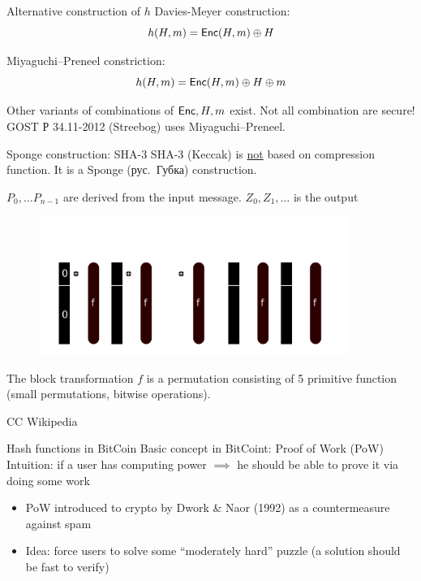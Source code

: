 \documentclass[usenames,dvipsnames, 9pt]{beamer}
\begin{document}
\begin{frame}{Alternative construction of $h$}
	\Large
	{\color{Orange} Davies-Meyer construction:}
	\[
	h(H, m) = \textsf{Enc}(H, m)\oplus H
	\]
	
	 {\color{Orange} Miyaguchi–Preneel  constriction:}
	 \[
	 h(H, m) = \textsf{Enc}(H, m)\oplus H \oplus m
	 \]
	 
	 Other variants of combinations of $\textsf{Enc}, H, m$ exist. Not all combination are secure! \\
	 GOST  Р 34.11-2012 (Streebog) uses Miyaguchi–Preneel.

\end{frame}

\begin{frame}{Sponge construction: SHA-3}
\large
SHA-3 (Keccak) is \underline{not} based on compression function. It is a {\color{Orange} Sponge} (рус.\ Губка) construction.

$P_0, \ldots P_{n-1}$ are derived from the input message.
$Z_0, Z_1, \ldots$ is the output

\begin{figure}
	\includegraphics[width=0.9\textwidth]{SpongeConstruction}
\end{figure}

The block transformation $f$ is  a permutation consisting of 5 primitive function (small permutations, bitwise operations).


\vfill
\small
{\color{gray} CC Wikipedia} 

\end{frame}


\begin{frame}{Hash functions in BitCoin}
\Large
Basic concept in BitCoint: {\color{Orange} Proof of Work (PoW)} \\
Intuition: if a  user has computing power $\implies$ he should be able to prove it via doing some work\\
\vspace{15pt}
\begin{itemize}
	\itemsep 1em
	\item PoW introduced to crypto by Dwork \& Naor (1992) as a countermeasure against spam
	\item {\color{Orange} Idea:}  force users to solve some ``moderately hard'' puzzle (a solution should be fast to verify)
\end{itemize}
\end{frame}
\end{document}
